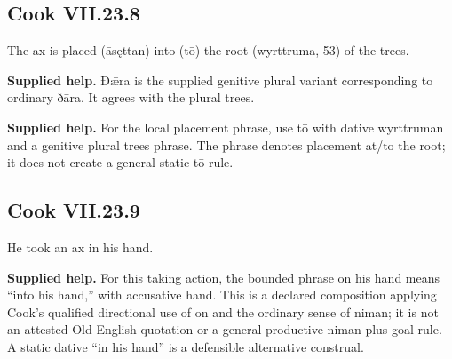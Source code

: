 \par\begin{minipage}{\linewidth}\raggedright
\subsection*{Cook VII.23.8}

The ax is placed (āsęttan) into (tō) the root (wyrttruma, 53) of the trees.

\end{minipage}\par\addvspace{4pt}

\textbf{Supplied help.} Ðǣra is the supplied genitive plural variant corresponding to ordinary ðāra. It agrees with the plural trees.

\textbf{Supplied help.} For the local placement phrase, use tō with dative wyrttruman and a genitive plural trees phrase. The phrase denotes placement at/\allowbreak{}to the root; it does not create a general static tō rule.

\par\begin{minipage}{\linewidth}\raggedright
\subsection*{Cook VII.23.9}

He took an ax in his hand.

\end{minipage}\par\addvspace{4pt}

\textbf{Supplied help.} For this taking action, the bounded phrase on his hand means “into his hand,” with accusative hand. This is a declared composition applying Cook’s qualified directional use of on and the ordinary sense of niman; it is not an attested Old English quotation or a general productive niman-plus-goal rule. A static dative “in his hand” is a defensible alternative construal.

